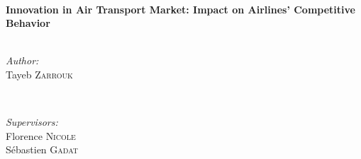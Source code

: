 \documentclass[titlepage, 11pt]{article}
\begin{document}
\begin{titlepage}

\HRule \\[0.4cm]
{ \huge \bfseries Innovation in Air Transport Market: Impact on Airlines' Competitive Behavior}\\[0.4cm] %
\HRule \\[1.5cm]
 

\begin{minipage}{0.4\textwidth}
\begin{flushleft} \large
\emph{Author:}\\
Tayeb \textsc{Zarrouk} %
\end{flushleft}
\end{minipage}
~
\begin{minipage}{0.4\textwidth}
\begin{flushright} \large
\emph{Supervisors:} \\
Florence \textsc{Nicole} \\ %
Sébastien \textsc{Gadat} %

\end{flushright}
\end{minipage}\\[2cm]






\vfill %

\end{titlepage}
\newcommand\tab[1][1cm]{\hspace*{#1}} 
\tableofcontents 
\listoffigures
\listoftables
\end{document}

